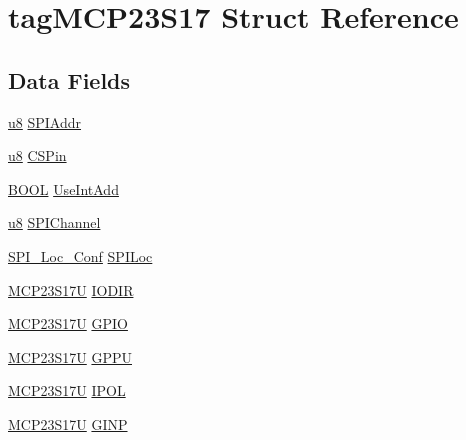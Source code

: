 \hypertarget{structtag_m_c_p23_s17}{\section{tag\-M\-C\-P23\-S17 Struct Reference}
\label{structtag_m_c_p23_s17}
}
\subsection*{Data Fields}
\begin{DoxyCompactItemize}
\item 
\hyperlink{p8_2pinguino_2core_2typedef_8h_aed742c436da53c1080638ce6ef7d13de}{u8} \hyperlink{structtag_m_c_p23_s17_ae26e1445076496ae432b32c2eda2404b}{S\-P\-I\-Addr}
\item 
\hyperlink{p8_2pinguino_2core_2typedef_8h_aed742c436da53c1080638ce6ef7d13de}{u8} \hyperlink{structtag_m_c_p23_s17_a09f926ede0f907462cd9c4aa33d14c39}{C\-S\-Pin}
\item 
\hyperlink{p8_2pinguino_2core_2typedef_8h_a67bb6a3d7ee6a2a5950ce437abbe31c8}{B\-O\-O\-L} \hyperlink{structtag_m_c_p23_s17_a7e6aa33b41bfbe7730c319ab6e92d2d6}{Use\-Int\-Add}
\item 
\hyperlink{p8_2pinguino_2core_2typedef_8h_aed742c436da53c1080638ce6ef7d13de}{u8} \hyperlink{structtag_m_c_p23_s17_a4378f10441758912284a247d7863f13b}{S\-P\-I\-Channel}
\item 
\hyperlink{struct_s_p_i___loc___conf}{S\-P\-I\-\_\-\-Loc\-\_\-\-Conf} \hyperlink{structtag_m_c_p23_s17_a9ccb6d79347bd833db5585b354af952f}{S\-P\-I\-Loc}
\item 
\hyperlink{_m_c_p23_s17_8c_a9474470a2cd5a5b80338162b06e6ef38}{M\-C\-P23\-S17\-U} \hyperlink{structtag_m_c_p23_s17_aa01df34e48dbb3159f671d1acdc44dbf}{I\-O\-D\-I\-R}
\item 
\hyperlink{_m_c_p23_s17_8c_a9474470a2cd5a5b80338162b06e6ef38}{M\-C\-P23\-S17\-U} \hyperlink{structtag_m_c_p23_s17_a6b49736d3a0718bbeac5e48a8d2d3ed3}{G\-P\-I\-O}
\item 
\hyperlink{_m_c_p23_s17_8c_a9474470a2cd5a5b80338162b06e6ef38}{M\-C\-P23\-S17\-U} \hyperlink{structtag_m_c_p23_s17_a1c2b8cf8c22febf5f3aebfea6310fc15}{G\-P\-P\-U}
\item 
\hyperlink{_m_c_p23_s17_8c_a9474470a2cd5a5b80338162b06e6ef38}{M\-C\-P23\-S17\-U} \hyperlink{structtag_m_c_p23_s17_a97413bedb26c0c521ead0632dcb949a4}{I\-P\-O\-L}
\item 
\hyperlink{_m_c_p23_s17_8c_a9474470a2cd5a5b80338162b06e6ef38}{M\-C\-P23\-S17\-U} \hyperlink{structtag_m_c_p23_s17_a611b6d537907e7d9a6389f430095f879}{G\-I\-N\-P}
\end{DoxyCompactItemize}



